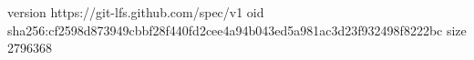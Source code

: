 version https://git-lfs.github.com/spec/v1
oid sha256:cf2598d873949cbbf28f440fd2cee4a94b043ed5a981ac3d23f932498f8222bc
size 2796368
